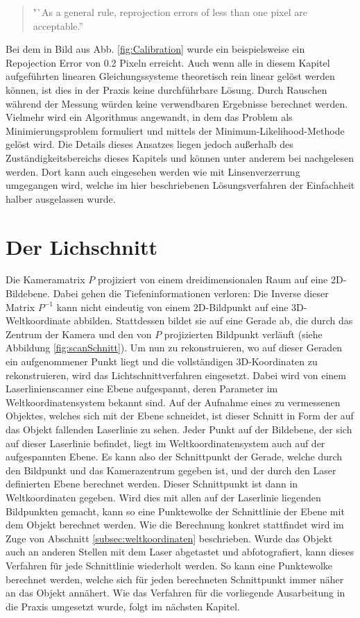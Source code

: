 \begin{quotation}
"`As a general rule, reprojection errors of less than one pixel are acceptable.''
\end{quotation}
Bei dem in Bild aus Abb. \ref{fig:Calibration} wurde ein beispielsweise ein Repojection Error von 0.2 Pixeln erreicht.\newline
Auch wenn alle in diesem Kapitel aufgeführten linearen Gleichungssysteme theoretisch rein linear gelöst werden können, ist dies in der Praxis keine durchführbare Lösung. Durch Rauschen während der Messung würden keine verwendbaren Ergebnisse berechnet werden. Vielmehr wird ein Algorithmus angewandt, in dem das Problem als Minimierungsproblem formuliert und mittels der Minimum-Likelihood-Methode gelöst wird. Die Details dieses Ansatzes liegen jedoch außerhalb des Zuständigkeitsbereichs dieses Kapitels und können unter anderem bei \cite{Zhang:00} nachgelesen werden. Dort kann auch eingesehen werden wie mit Linsenverzerrung umgegangen wird, welche im hier beschriebenen Lösungsverfahren der Einfachheit halber ausgelassen wurde.

\section{Der Lichschnitt}
Die Kameramatrix \(P\) projiziert von einem dreidimensionalen Raum auf eine 2D-Bildebene. Dabei gehen die Tiefeninformationen verloren: Die Inverse dieser Matrix \(P^{-1}\) kann nicht eindeutig von einem 2D-Bildpunkt auf eine 3D-Weltkoordinate abbilden. Stattdessen bildet sie auf eine Gerade ab, die durch das Zentrum der Kamera und den von \(P\) projizierten Bildpunkt verläuft (siehe Abbildung \ref{fig:scanSchnitt}). Um nun zu rekonstruieren, wo auf dieser Geraden ein aufgenommener Punkt liegt und die vollständigen 3D-Koordinaten zu rekonstruieren, wird das Lichtschnittverfahren eingesetzt. Dabei wird von einem Laserlinienscanner eine Ebene aufgespannt, deren Parameter im Weltkoordinatensystem bekannt sind. Auf der Aufnahme eines zu vermessenen Objektes, welches sich mit der Ebene schneidet, ist dieser Schnitt in Form der auf das Objekt fallenden Laserlinie zu sehen. Jeder Punkt auf der Bildebene, der sich auf dieser Laserlinie befindet, liegt im Weltkoordinatensystem auch auf der aufgespannten Ebene. Es kann also der Schnittpunkt der Gerade, welche durch den Bildpunkt und das Kamerazentrum gegeben ist, und der durch den Laser definierten Ebene berechnet werden. Dieser Schnittpunkt ist dann in Weltkoordinaten gegeben. Wird dies mit allen auf der Laserlinie liegenden Bildpunkten gemacht, kann so eine Punktewolke der Schnittlinie der Ebene mit dem Objekt berechnet werden. Wie die Berechnung konkret stattfindet wird im Zuge von Abschnitt \ref{subsec:weltkoordinaten} beschrieben.\newline
Wurde das Objekt auch an anderen Stellen mit dem Laser abgetastet und abfotografiert, kann dieses Verfahren für jede Schnittlinie wiederholt werden. So kann eine Punktewolke berechnet werden, welche sich für jeden berechneten Schnittpunkt immer näher an das Objekt annähert. Wie das Verfahren für die vorliegende Ausarbeitung in die Praxis umgesetzt wurde, folgt im nächsten Kapitel.

